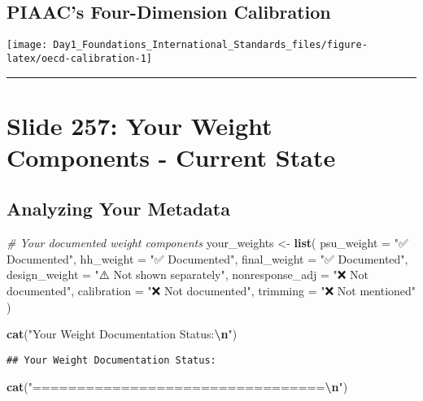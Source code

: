 \documentclass[
]{article}
\newenvironment{Shaded}{\begin{snugshade}}{\end{snugshade}}
\newcommand{\AttributeTok}[1]{\textcolor[rgb]{0.13,0.29,0.53}{#1}}
\newcommand{\CommentTok}[1]{\textcolor[rgb]{0.56,0.35,0.01}{\textit{#1}}}
\newcommand{\FunctionTok}[1]{\textcolor[rgb]{0.13,0.29,0.53}{\textbf{#1}}}
\newcommand{\NormalTok}[1]{#1}
\newcommand{\OtherTok}[1]{\textcolor[rgb]{0.56,0.35,0.01}{#1}}
\newcommand{\SpecialCharTok}[1]{\textcolor[rgb]{0.81,0.36,0.00}{\textbf{#1}}}
\newcommand{\StringTok}[1]{\textcolor[rgb]{0.31,0.60,0.02}{#1}}
\begin{document}
\subsection{PIAAC's Four-Dimension
Calibration}\label{piaacs-four-dimension-calibration}

\texttt{[image: Day1\_Foundations\_International\_Standards\_files/figure-latex/oecd-calibration-1]}

\begin{center}\rule{0.5\linewidth}{0.5pt}\end{center}

\section{Slide 257: Your Weight Components - Current
State}\label{slide-257-your-weight-components---current-state}

\subsection{Analyzing Your Metadata}\label{analyzing-your-metadata-1}

\begin{Shaded}
\begin{Highlighting}[]
\CommentTok{\# Your documented weight components}
\NormalTok{your\_weights }\OtherTok{\textless{}{-}} \FunctionTok{list}\NormalTok{(}
  \AttributeTok{psu\_weight =} \StringTok{"✅ Documented"}\NormalTok{,}
  \AttributeTok{hh\_weight =} \StringTok{"✅ Documented"}\NormalTok{, }
  \AttributeTok{final\_weight =} \StringTok{"✅ Documented"}\NormalTok{,}
  \AttributeTok{design\_weight =} \StringTok{"⚠️ Not shown separately"}\NormalTok{,}
  \AttributeTok{nonresponse\_adj =} \StringTok{"❌ Not documented"}\NormalTok{,}
  \AttributeTok{calibration =} \StringTok{"❌ Not documented"}\NormalTok{,}
  \AttributeTok{trimming =} \StringTok{"❌ Not mentioned"}
\NormalTok{)}

\FunctionTok{cat}\NormalTok{(}\StringTok{"Your Weight Documentation Status:}\SpecialCharTok{\textbackslash{}n}\StringTok{"}\NormalTok{)}
\end{Highlighting}
\end{Shaded}

\begin{verbatim}
## Your Weight Documentation Status:
\end{verbatim}

\begin{Shaded}
\begin{Highlighting}[]
\FunctionTok{cat}\NormalTok{(}\StringTok{"=================================}\SpecialCharTok{\textbackslash{}n}\StringTok{"}\NormalTok{)}
\end{Highlighting}
\end{Shaded}
\end{document}
